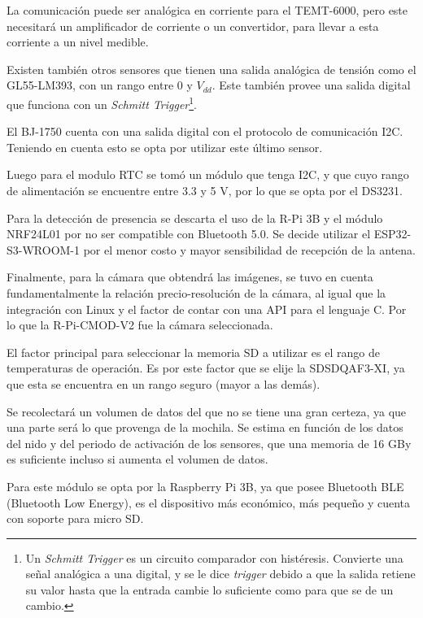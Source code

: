 La comunicación puede ser analógica en corriente para el TEMT-6000, pero este necesitará un amplificador de corriente o un convertidor, para llevar a esta corriente a un nivel medible.

Existen también otros sensores que tienen una salida analógica de tensión como el GL55-LM393, con un rango entre 0 y $V_{dd}$. Este también provee una salida digital que funciona con un \textit{Schmitt Trigger}\footnote{Un \textit{Schmitt Trigger} es un circuito comparador con histéresis. Convierte una señal analógica a una digital, y se le dice \textit{trigger} debido a que la salida retiene su valor hasta que la entrada cambie lo suficiente como para que se de un cambio.}.

El BJ-1750 cuenta con una salida digital con el protocolo de comunicación I2C. Teniendo en cuenta esto se opta por utilizar este último sensor. 

Luego para el modulo RTC se tom\'o un  m\'odulo que tenga I2C, y que cuyo rango de alimentación se encuentre entre 3.3 y 5 V, por lo que se opta por el DS3231.

Para la detección de presencia se descarta el uso de la R-Pi 3B y el módulo NRF24L01 por no ser compatible con Bluetooth 5.0. Se decide utilizar el ESP32-S3-WROOM-1 por el menor costo y mayor sensibilidad de recepción de la antena.

Finalmente, para la cámara que obtendrá las imágenes, se tuvo en cuenta fundamentalmente la relación precio-resolución de la cámara, al igual que la integración con Linux y el factor de contar con una API para el lenguaje C. Por lo que la R-Pi-CMOD-V2 fue la cámara seleccionada.






El factor principal para seleccionar la memoria SD a utilizar es el rango de temperaturas de operación. Es por este factor que se elije la SDSDQAF3-XI, ya que esta se encuentra en un rango seguro (mayor a las demás).

Se recolectará un volumen de datos del que no se tiene una gran certeza, ya que una parte será lo que provenga de la mochila. Se estima en función de los datos del nido y del periodo de activación de los sensores, que una memoria de 16 GBy es suficiente incluso si aumenta el volumen de datos.


Para este módulo se opta por la Raspberry Pi 3B, ya que posee Bluetooth BLE (Bluetooth Low Energy), es el dispositivo más económico, más pequeño y cuenta con soporte para micro SD.

